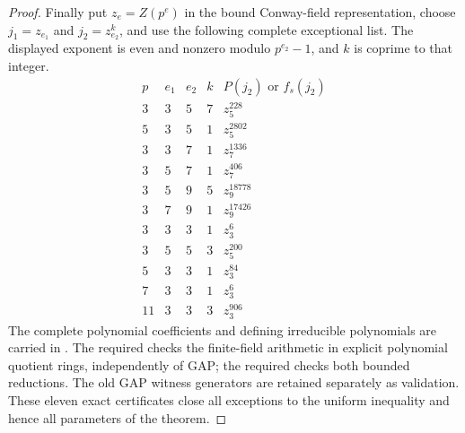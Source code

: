 \begin{proof}
Finally put $z_e=Z(p^e)$ in the bound Conway-field representation,
choose $j_1=z_{e_1}$ and $j_2=z_{e_2}^k$, and use the following complete
exceptional list. The displayed exponent is even and nonzero modulo
$p^{e_2}-1$, and $k$ is coprime to that integer.
{\renewcommand{\arraystretch}{1.4}
\[
\begin{array}{ccc|r|r}
 p&e_1&e_2&k& P(j_2)\text{ or }f_s(j_2)\\\hline
 3&3&5&7&z_5^{228}\\5&3&5&1&z_5^{2802}\\
 3&3&7&1&z_7^{1336}\\3&5&7&1&z_7^{406}\\
 3&5&9&5&z_9^{18778}\\3&7&9&1&z_9^{17426}\\
 3&3&3&1&z_3^6\\3&5&5&3&z_5^{200}\\
 5&3&3&1&z_3^{84}\\7&3&3&1&z_3^6\\11&3&3&3&z_3^{906}
\end{array}
\]}
The complete polynomial coefficients and defining irreducible polynomials
are carried in . The required
 checks the finite-field arithmetic
in explicit polynomial quotient rings, independently of GAP; the
required  checks both bounded
reductions. The old GAP witness generators are retained separately as
validation. These eleven exact certificates close all exceptions to
the uniform inequality and hence all parameters of the theorem.
\end{proof}
